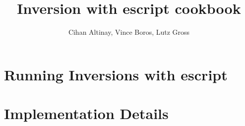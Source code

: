 \documentclass{esysdoc}
\begin{document}
\pagestyle{empty} %

\title{Inversion with escript cookbook}
\author{Cihan Altinay, Vince Boros, Lutz Gross}

\maketitle



\tableofcontents %
\cleardoublepage %

\pagestyle{fancy}



\part{Running Inversions with escript}

\part{Implementation Details}








\appendix


\end{document}
